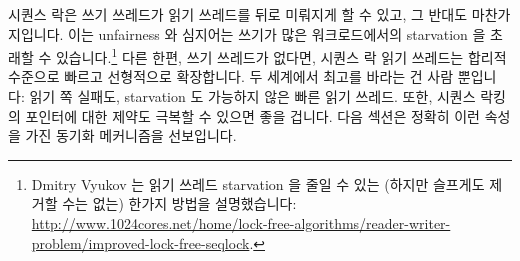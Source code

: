 \fi

시퀀스 락은 쓰기 쓰레드가 읽기 쓰레드를 뒤로 미뤄지게 할 수 있고, 그 반대도
마찬가지입니다.
이는 unfairness 와 심지어는 쓰기가 많은 워크로드에서의 starvation 을 초래할 수
있습니다.\footnote{
	Dmitry Vyukov 는 읽기 쓰레드 starvation 을 줄일 수 있는 (하지만
	슬프게도 제거할 수는 없는) 한가지 방법을 설명했습니다:
	\url{http://www.1024cores.net/home/lock-free-algorithms/reader-writer-problem/improved-lock-free-seqlock}.}
다른 한편, 쓰기 쓰레드가 없다면, 시퀀스 락 읽기 쓰레드는 합리적 수준으로 빠르고
선형적으로 확장합니다.
두 세계에서 최고를 바라는 건 사람 뿐입니다: 읽기 쪽 실패도, starvation 도
가능하지 않은 빠른 읽기 쓰레드.
또한, 시퀀스 락킹의 포인터에 대한 제약도 극복할 수 있으면 좋을 겁니다.
다음 섹션은 정확히 이런 속성을 가진 동기화 메커니즘을 선보입니다.

